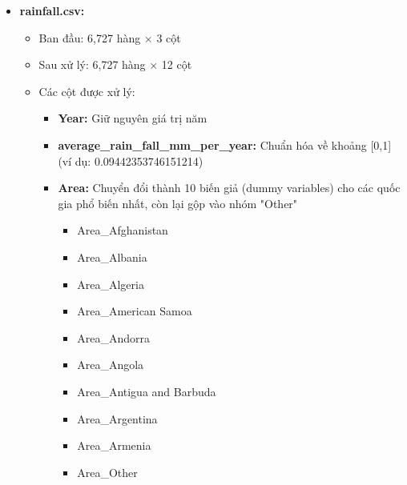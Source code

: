 \begin{itemize}
    \item \textbf{rainfall.csv:}
    \begin{itemize}
        \item Ban đầu: 6,727 hàng × 3 cột
        \item Sau xử lý: 6,727 hàng × 12 cột
        \item Các cột được xử lý:
        \begin{itemize}
            \item \textbf{Year:} Giữ nguyên giá trị năm
            \item \textbf{average\_rain\_fall\_mm\_per\_year:} Chuẩn hóa về khoảng [0,1] (ví dụ: 0.09442353746151214)
            \item \textbf{Area:} Chuyển đổi thành 10 biến giả (dummy variables) cho các quốc gia phổ biến nhất, còn lại gộp vào nhóm "Other"
            \begin{itemize}
                \item Area\_Afghanistan
                \item Area\_Albania
                \item Area\_Algeria
                \item Area\_American Samoa
                \item Area\_Andorra
                \item Area\_Angola
                \item Area\_Antigua and Barbuda
                \item Area\_Argentina
                \item Area\_Armenia
                \item Area\_Other
            \end{itemize}
        \end{itemize}
    \end{itemize}
    

\end{itemize}
